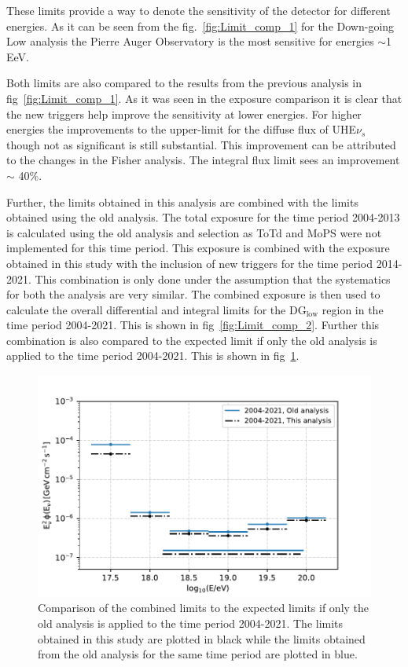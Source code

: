 These limits provide a way to denote the sensitivity of the detector for different energies. As it can be seen from the fig.~\ref{fig:Limit_comp_1} for the Down-going Low analysis the Pierre Auger Observatory is the most sensitive for energies $\sim$1 EeV. 

Both limits are also compared to the results from the previous analysis in fig~\ref{fig:Limit_comp_1}. As it was seen in the exposure comparison it is clear that the new triggers help improve the sensitivity at lower energies. For higher energies the improvements to the upper-limit for the diffuse flux of UHE${\nu_s}$ though not as significant is still substantial. This improvement can be attributed to the changes in the Fisher analysis. The integral flux limit sees an improvement $\sim$ 40\%. 

Further, the limits obtained in this analysis are combined with the limits obtained using the old analysis. The total exposure for the time period 2004-2013 is calculated using the old analysis and selection as ToTd and MoPS were not implemented for this time period. This exposure is combined with the exposure obtained in this study with the inclusion of new triggers for the time period 2014-2021. This combination is only done under the assumption that the systematics for both the analysis are very similar. The combined exposure is then used to calculate the overall differential and integral limits for the DG$_{\text{low}}$ region in the time period 2004-2021. This is shown in fig~\ref{fig:Limit_comp_2}. Further this combination is also compared to the expected limit if only the old analysis is applied to the time period 2004-2021. This is shown in fig~\ref{fig:Limit_comp_3}.



\begin{figure}[h!]
  \centering
  \includegraphics[width=14.5cm]{thesis_figures/ExpLimits/Integ_DiffLimit_comp_combined_new_sim_optim_3.pdf}
  \caption{Comparison of the combined limits to the expected limits if only the old analysis is applied to the time period 2004-2021. The limits obtained in this study are plotted in black while the limits obtained from the old analysis for the same time period are plotted in blue.}
  \label{fig:Limit_comp_3}
\end{figure}

